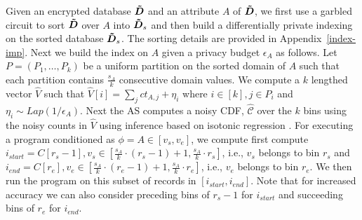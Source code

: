 Given an encrypted database $\boldsymbol{\tilde{D}}$ and an attribute $A$ of $\boldsymbol{\tilde{D}}$, we first use a garbled circuit to sort $\boldsymbol{\tilde{D}}$ over $A$ into $\boldsymbol{\tilde{D}}_s$ and then build a differentially private indexing on the sorted database $\boldsymbol{\tilde{D}}_s$. The sorting details are provided in Appendix~\ref{index-imp}. Next we build the index on $A$ given a privacy budget $\epsilon_{A}$ as follows. Let $P=(P_1,\ldots,P_k)$ be a uniform partition on the sorted domain of $A$ such that each partition contains $\frac{s_A}{k}$ consecutive domain values. We compute a $k$ lengthed vector $\hat{V}$ such that $\hat{V}[i]=\sum_j ct_{A,j}+\eta_i$ where $i \in [k], j \in P_i$ and $\eta_i\sim Lap(1/\epsilon_A)$. 
Next the \textsf{AS} computes a noisy CDF, $\hat{\mathcal{C}}$ over the $k$ bins using the noisy counts in $\hat{V}$ using inference based on isotonic regression \cite{cdf}. For executing a program conditioned as $\phi=A \in [v_s,v_e]$, we compute first compute $i_{start}=C[r_s-1], v_s \in [\frac{s_A}{k}\cdot(r_s-1)+1,\frac{s_A}{k}\cdot r_s]$, i.e., $v_s$ belongs to bin $r_s$   and  $i_{end}=C[r_e], v_e \in [\frac{s_A}{k}\cdot(r_e-1)+1,\frac{s_A}{k}\cdot r_e]$, i.e., $v_e$ belongs to bin $r_e$. We then run the program on this subset of records in $[i_{start},i_{end}]$. Note that for increased accuracy we can also consider preceding bins of $r_s-1$ for $i_{start}$ and succeeding bins of $r_e$ for $i_{end}$.



